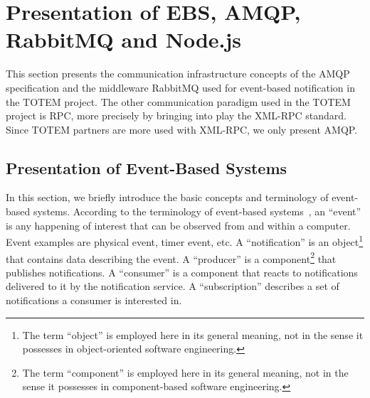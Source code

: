 
\section{Presentation of EBS, AMQP, \textsf{RabbitMQ} and \textsf{Node.js}}
\label{S_presentation_concepts}

This section presents the communication infrastructure concepts of the
AMQP specification and the middleware \textsf{RabbitMQ} used for
event-based notification in the TOTEM project. The other communication
paradigm used in the TOTEM project is RPC, more precisely by
bringing into play the XML-RPC standard. Since TOTEM partners are more
used with XML-RPC, we only present AMQP.

\subsection{Presentation of Event-Based Systems}
\label{SS_presentation_ebs}

In this section, we briefly introduce the basic concepts and
terminology of event-based systems. According to the terminology of event-based systems~\cite{ebs}, an
``event'' is any happening of interest that can be observed from and
within a computer. Event examples are physical event, timer event,
etc. A ``notification'' is an object\footnote{The term ``object'' is
  employed here in its general meaning, not in the sense it possesses
  in object-oriented software engineering.} that contains data
describing the event. A ``producer'' is a component\footnote{The term
  ``component'' is employed here in its general meaning, not in the
  sense it possesses in component-based software engineering.} that
publishes notifications. A ``consumer'' is a component that reacts to
notifications delivered to it by the notification service. A
``subscription'' describes a set of notifications a consumer is
interested in.

